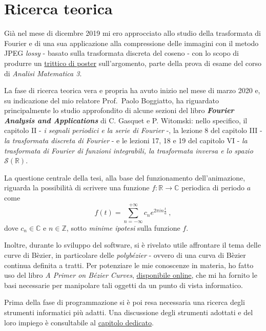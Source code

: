 \documentclass[
]{book}
\begin{document}
\hypertarget{ricerca}{%
\section{Ricerca teorica}\label{ricerca}}

Già nel mese di dicembre 2019 mi ero approcciato allo studio della trasformata di Fourier e di una sua applicazione alla compressione delle immagini con il metodo JPEG \emph{lossy} - basato sulla trasformata discreta del coseno - con lo scopo di produrre un \href{https://bradwave.myportfolio.com/the-fourier-transform}{trittico di poster} sull'argomento, parte della prova di esame del corso di \emph{Analisi Matematica 3}.

La fase di ricerca teorica vera e propria ha avuto inizio nel mese di marzo 2020 e, su indicazione del mio relatore Prof.~Paolo Boggiatto, ha riguardato principalmente lo studio approfondito di alcune sezioni del libro \emph{\textbf{Fourier Analysis and Applications}} di C. Gasquet e P. Witomski: nello specifico, il capitolo II - \emph{i segnali periodici e la serie di Fourier} -, la lezione 8 del capitolo III - \emph{la trasformata discreta di Fourier} - e le lezioni 17, 18 e 19 del capitolo VI - \emph{la trasformata di Fourier di funzioni integrabili, la trasformata inversa e lo spazio \(\mathcal{S}(\mathbb{R})\)}.

La questione centrale della tesi, alla base del funzionamento dell'animazione, riguarda la possibilità di scrivere una funzione \(f: \mathbb{R} \longrightarrow \mathbb{C}\) periodica di periodo \(a\) come
\[f(t)=\sum_{n=-\infty}^{+\infty}c_{n}e^{2\pi in \frac{t}{a}} \ ,\]
dove \(c_n \in \mathbb{C}\) e \(n \in \mathbb{Z}\), sotto \emph{minime ipotesi} sulla funzione \(f\).

Inoltre, durante lo sviluppo del software, si è rivelato utile affrontare il tema delle curve di Bèzier, in particolare delle \emph{polybézier} - ovvero di una curva di Bèzier continua definita a tratti. Per potenziare le mie conoscenze in materia, ho fatto uso del libro \emph{A Primer on Bézier Curves}, \href{https://pomax.github.io/bezierinfo/}{disponibile online}, che mi ha fornito le basi necessarie per manipolare tali oggetti da un punto di vista informatico.

Prima della fase di programmazione si è poi resa necessaria una ricerca degli strumenti informatici più adatti. Una discussione degli strumenti adottati e del loro impiego è consultabile al \protect\hyperlink{software}{capitolo dedicato}.
\end{document}
